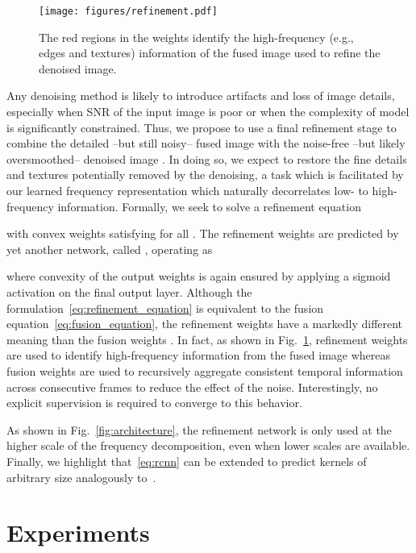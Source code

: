 \documentclass[final]{cvpr}
\begin{document}
    \begin{figure}[t]
        \centering
        \texttt{[image: figures/refinement.pdf]}
        \caption{The red regions in the weights  identify the high-frequency (e.g., edges and textures) information of the fused image used to refine the denoised image.}
        \label{fig:refinement} 
    \end{figure}
    
    Any denoising method is likely to introduce artifacts and loss of image details, especially when SNR of the input image is poor or when the complexity of model is significantly constrained. Thus, we propose to use a final refinement stage to combine the detailed --but still noisy-- fused image  with the noise-free --but likely oversmoothed-- denoised image . In doing so, we expect to restore the fine details and textures potentially removed by the denoising, a task which is facilitated by our learned frequency representation which naturally decorrelates low- to high-frequency information. Formally, we seek to solve a refinement equation
    
    with convex weights satisfying  for all . The refinement weights are predicted by yet another network, called , operating as
    
    where convexity of the output weights is again ensured by applying a sigmoid activation on the final output layer. Although the formulation~\eqref{eq:refinement_equation} is equivalent to the fusion equation~\eqref{eq:fusion_equation}, the refinement weights  have a markedly different meaning than the fusion weights . In fact, as shown in Fig.~\ref{fig:refinement}, refinement weights are used to identify high-frequency information from the fused image whereas fusion weights are used to recursively aggregate consistent temporal information across consecutive frames to reduce the effect of the noise. Interestingly, no explicit supervision is required to converge to this behavior.

    As shown in Fig.~\ref{fig:architecture}, the refinement network is only used at the higher scale of the frequency decomposition, even when lower scales are available. Finally, we highlight that~\eqref{eq:rcnn} can be extended to predict kernels of arbitrary size analogously to~\cite{mildenhall2018kpn}.
    
    
    \section{Experiments}
    \label{section:experiments}
\end{document}
